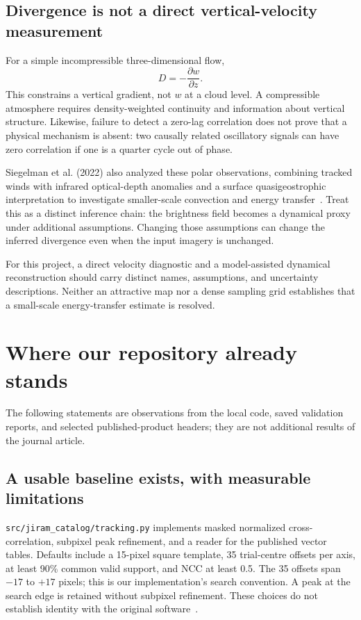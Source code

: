 \documentclass[11pt]{article}
\begin{document}
\subsection{Divergence is not a direct vertical-velocity measurement}

For a simple incompressible three-dimensional flow,
\begin{equation}
 D=-\frac{\partial w}{\partial z}.
\end{equation}
This constrains a vertical gradient, not $w$ at a cloud level. A compressible
atmosphere requires density-weighted continuity and information about vertical
structure. Likewise, failure to detect a zero-lag correlation does not prove
that a physical mechanism is absent: two causally related oscillatory
signals can have zero correlation if one is a quarter cycle out of phase.

Siegelman et al. (2022) also analyzed these polar observations, combining
tracked winds with infrared optical-depth anomalies and a surface
quasigeostrophic interpretation to investigate smaller-scale convection and
energy transfer~\cite{siegelman}. Treat this as a distinct inference chain:
the brightness field becomes a dynamical proxy under additional assumptions.
Changing those assumptions can change the inferred divergence even when the
input imagery is unchanged.

For this project, a direct velocity diagnostic and a model-assisted dynamical
reconstruction should carry distinct names, assumptions, and uncertainty
descriptions. Neither an attractive map nor a dense sampling grid establishes
that a small-scale energy-transfer estimate is resolved.

\section{Where our repository already stands}\label{sec:repo}

The following statements are observations from the local code, saved
validation reports, and selected published-product headers; they are not
additional results of the journal article.

\subsection{A usable baseline exists, with measurable limitations}

\texttt{src/jiram\_catalog/tracking.py} implements masked normalized
cross-correlation, subpixel peak refinement, and a reader for the published
vector tables. Defaults include a 15-pixel square template, 35 trial-centre
offsets per axis, at least 90\% common valid support, and NCC at least 0.5.
The 35 offsets span $-17$ to $+17$ pixels; this is our implementation's
search convention. A peak at the search edge is retained without subpixel
refinement. These choices do not establish identity with the original
software~\cite{repotracker}.
\end{document}
